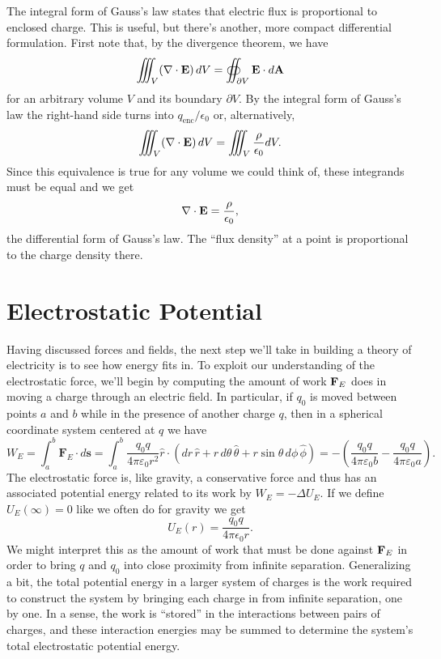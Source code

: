 \documentclass[../p051main.tex]{subfiles}
\begin{document}
The integral form of Gauss's law states that electric flux is proportional to enclosed charge.
This is useful, but there's another, more compact differential formulation.
First note that, by the divergence theorem, we have
\[ \iiint_V (\nabla \cdot \mathbf{E}) \,dV = \oiint_{\partial V} \mathbf{E} \cdot d\mathbf{A} \]
for an arbitrary volume $V$ and its boundary $\partial V$.
By the integral form of Gauss's law the right-hand side turns into $q_\textrm{enc} / \epsilon_0$ or, alternatively,
\[ \iiint_V (\nabla \cdot \mathbf{E}) \,dV = \iiint_V \frac{\rho}{\epsilon_0} dV. \]
Since this equivalence is true for any volume we could think of, these integrands must be equal and we get
\[ \nabla \cdot \mathbf{E} = \frac{\rho}{\epsilon_0}, \]
the differential form of Gauss's law.
The ``flux density'' at a point is proportional to the charge density there.

\section{Electrostatic Potential}
Having discussed forces and fields, the next step we'll take in building a theory of electricity is to see how energy fits in.
To exploit our understanding of the electrostatic force, we'll begin by computing the amount of work $\mathbf{F}_E$ does in moving a charge through an electric field.
In particular, if $q_0$ is moved between points $a$ and $b$ while in the presence of another charge $q$, then in a spherical coordinate system centered at $q$ we have
\[ W_E = \int_a^b \mathbf{F}_E \cdot d\mathbf{s} = \int_a^b \frac{q_0q}{4\pi\varepsilon_0r^2} \hat{r} \cdot (dr \,\hat{r} + r\,d\theta \,\hat{\theta} + r\sin \theta \,d\phi \,\hat{\phi}) = -\left( \frac{q_0q}{4\pi\varepsilon_0b} - \frac{q_0q}{4\pi\varepsilon_0a} \right). \]
The electrostatic force is, like gravity, a conservative force and thus has an associated potential energy related to its work by $W_E = -\Delta U_E$.
If we define $U_E(\infty) = 0$ like we often do for gravity we get
\[ U_E(r) = \frac{q_0q}{4\pi \epsilon_0 r}. \]
We might interpret this as the amount of work that must be done against $\mathbf{F}_E$ in order to bring $q$ and $q_0$ into close proximity from infinite separation.
Generalizing a bit, the total potential energy in a larger system of charges is the work required to construct the system by bringing each charge in from infinite separation, one by one.
In a sense, the work is ``stored'' in the interactions between pairs of charges, and these interaction energies may be summed to determine the system's total electrostatic potential energy.
\end{document}
